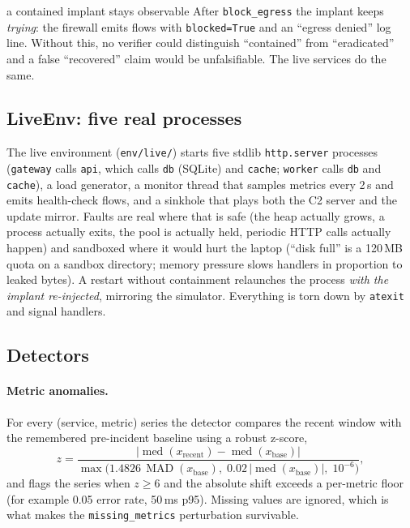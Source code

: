 \documentclass[11pt,a4paper]{article}
\newcommand{\code}[1]{\texttt{#1}}
\begin{document}
\begin{designdecision}{a contained implant stays observable}
After \code{block\_egress} the implant keeps \emph{trying}: the firewall emits flows with
\code{blocked=True} and an ``egress denied'' log line. Without this, no verifier could distinguish
``contained'' from ``eradicated'' and a false ``recovered'' claim would be unfalsifiable. The live
services do the same.
\end{designdecision}

\subsection{LiveEnv: five real processes}
\label{sec:live}
The live environment (\code{env/live/}) starts five stdlib \code{http.server} processes
(\code{gateway} calls \code{api}, which calls \code{db} (SQLite) and \code{cache}; \code{worker} calls \code{db} and \code{cache}),
a load generator, a monitor thread that samples metrics every 2\,s and emits health-check flows, and
a sinkhole that plays both the C2 server and the update mirror. Faults are real where that is safe
(the heap actually grows, a process actually exits, the pool is actually held, periodic HTTP calls
actually happen) and sandboxed where it would hurt the laptop (``disk full'' is a 120\,MB quota on a
sandbox directory; memory pressure slows handlers in proportion to leaked bytes). A restart without
containment relaunches the process \emph{with the implant re-injected}, mirroring the simulator.
Everything is torn down by \code{atexit} and signal handlers.

\subsection{Detectors}
\paragraph{Metric anomalies.} For every (service, metric) series the detector compares the recent
window with the remembered pre-incident baseline using a robust z-score,
\begin{equation}
  z = \frac{\big|\operatorname{med}(x_{\text{recent}}) - \operatorname{med}(x_{\text{base}})\big|}
           {\max\!\big(1.4826\,\operatorname{MAD}(x_{\text{base}}),\; 0.02\,|\operatorname{med}(x_{\text{base}})|,\; 10^{-6}\big)},
  \label{eq:z}
\end{equation}
and flags the series when $z\ge6$ and the absolute shift exceeds a per-metric floor (for example
0.05 error rate, 50\,ms p95). Missing values are ignored, which is what makes the
\code{missing\_metrics} perturbation survivable.
\end{document}

